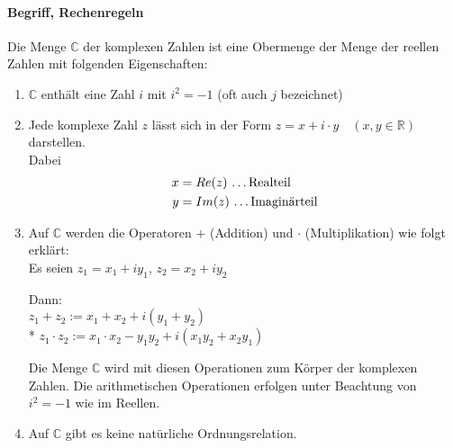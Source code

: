 \documentclass[a4paper]{scrartcl}
\begin{document}
\paragraph{Begriff, Rechenregeln} 
Die Menge $\mathbb{C}$ der komplexen Zahlen ist eine Obermenge der Menge der reellen Zahlen mit folgenden Eigenschaften:
\begin{enumerate}
\item $\mathbb{C}$ enthält eine Zahl $i$ mit $i^2 = -1$ (oft auch $j$ bezeichnet)
\item Jede komplexe Zahl $z$ lässt sich in der Form $z = x + i \cdot y \quad (x,y \in \mathbb{R})$ darstellen.\\
Dabei
\begin{align*}
x &= Re(z) \text{ \dots Realteil}\\
y &= Im(z) \text{ \dots Imaginärteil}
\end{align*}
\item Auf $\mathbb{C}$ werden die Operatoren $+$ (Addition) und $\cdot$ (Multiplikation) wie folgt erklärt:\\
Es seien $z_1 = x_1 + i y_1, \, z_2 = x_2 + i y_2$

Dann:\\ 
$z_1 + z_2 := x_1 + x_2 + i (y_1 + y_2)$\\*
$z_1 \cdot z_2 := x_1 \cdot x_2 - y_1 y_2 + i (x_1 y_2 + x_2 y_1)$

Die Menge $\mathbb{C}$ wird mit diesen Operationen zum Körper der komplexen Zahlen. Die arithmetischen Operationen erfolgen unter Beachtung von $i^2 = -1$ wie im Reellen.

\item Auf $\mathbb{C}$ gibt es keine natürliche Ordnungsrelation.
\end{enumerate}
\end{document}
